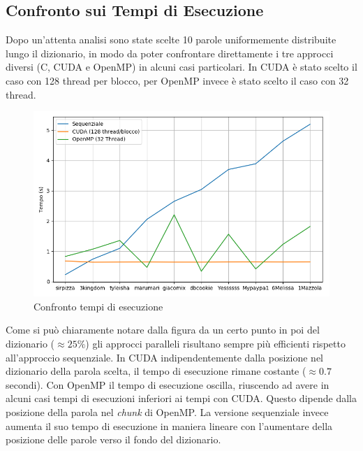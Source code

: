\documentclass[10pt,twocolumn,letterpaper]{article}
\begin{document}
\subsection{Confronto sui Tempi di Esecuzione}
Dopo un'attenta analisi sono state scelte 10 parole uniformemente distribuite lungo il dizionario, in modo da poter confrontare direttamente i tre approcci diversi (C, CUDA e OpenMP) in alcuni casi particolari. \newline
In CUDA è stato scelto il caso con 128 thread per blocco, per OpenMP invece è stato scelto il caso con 32 thread.

\begin{figure}[h]
\includegraphics[width=\linewidth]{Plots/tempi.png}
\caption{Confronto tempi di esecuzione}
\end{figure}

Come si può chiaramente notare dalla figura da un certo punto in poi del dizionario ($\approx25\%$) gli approcci paralleli risultano sempre più efficienti rispetto all'approccio sequenziale.\newline
In CUDA indipendentemente dalla posizione nel dizionario della parola scelta, il tempo di esecuzione rimane costante ($\approx0.7$ secondi).
Con OpenMP il tempo di esecuzione oscilla, riuscendo ad avere in alcuni casi tempi di esecuzioni inferiori ai tempi con CUDA. Questo dipende dalla posizione della parola nel \textit{chunk} di OpenMP.
La versione sequenziale invece aumenta il suo tempo di esecuzione in maniera lineare con l'aumentare della posizione delle parole verso il fondo del dizionario. 
\end{document}
